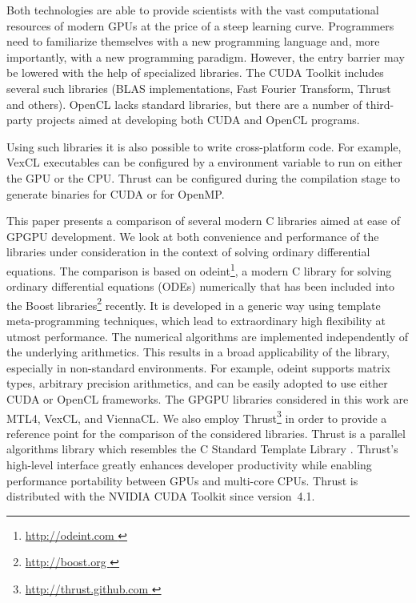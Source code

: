 \documentclass[final]{siamltex}
\newcommand{\addpp}[1]{{#1\nolinebreak[4]\hspace{-.05em}\raisebox{.4ex}{\tiny\bf ++}}\xspace}
\newcommand{\Cpp}{\addpp{C}}
\begin{document}
Both technologies are able to provide scientists with the vast computational
resources of modern GPUs at the price of a steep learning curve.  Programmers
need to familiarize themselves with a new programming language and, more
importantly, with a new programming paradigm. However, the entry barrier may be
lowered with the help of specialized libraries. The CUDA Toolkit includes
several such libraries (BLAS implementations, Fast Fourier Transform, Thrust
and others). OpenCL lacks standard libraries, but there are a number of
third-party projects aimed at developing both CUDA and OpenCL programs.

Using such libraries it is also possible to write cross-platform
code. For example, VexCL executables can be configured by a
environment variable to run on either the GPU or the CPU. Thrust can
be configured during the compilation stage to generate binaries for
CUDA or for OpenMP.

This paper presents a comparison of several modern \Cpp libraries aimed at ease
of GPGPU development. We look at both convenience and performance of the
libraries under consideration in the context of solving ordinary differential
equations.  The comparison is based on odeint\footnote{\href{
http://odeint.com }{ http://odeint.com } }, a modern \Cpp library for solving
ordinary differential equations (ODEs) numerically  \cite{OdeintRef2,OdeintRef1}
that has been included into the Boost
libraries\footnote{ \href{ http://boost.org } { http://boost.org } } recently.
It is developed in a generic way using template meta-programming techniques,
which lead to extraordinary high flexibility at utmost performance. The
numerical algorithms are implemented independently of the underlying
arithmetics. This results in a broad applicability of the library, especially
in non-standard environments.  For example, odeint supports matrix types,
arbitrary precision arithmetics, and can be easily adopted to use either CUDA
or OpenCL frameworks.  The GPGPU libraries considered in this work are MTL4,
VexCL, and ViennaCL. We also employ Thrust\footnote{ \href{
http://thrust.github.com }{ http://thrust.github.com }} in order to provide a
reference point for the comparison of the considered libraries.
Thrust is a parallel algorithms library which resembles the \Cpp Standard
Template Library \cite{ThrustRef}.  Thrust's high-level interface greatly
enhances developer productivity while enabling performance portability between
GPUs and multi-core CPUs.  Thrust is distributed with the NVIDIA CUDA Toolkit
since version~4.1.
\end{document}
